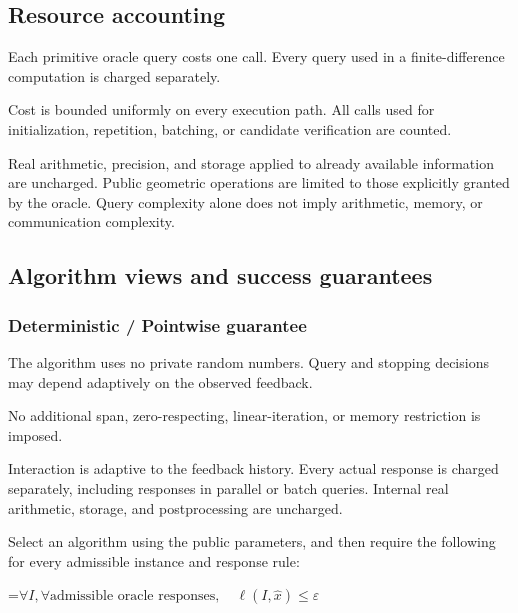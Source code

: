 \documentclass[10pt,a4paper]{article}
\newcommand{\AtlasMath}[1]{\par\begingroup\centering\setbox0=\hbox{$\displaystyle #1$}\ifdim\wd0>1.4\linewidth\typeout{ATLAS WIDE FORMULA: \the\wd0}\fi\ifdim\wd0>\linewidth\resizebox{\linewidth}{!}{\box0}\else\box0\fi\par\endgroup}
\begin{document}
\subsection{Resource accounting}


Each primitive oracle query costs one call. Every query used in a finite-difference computation is charged separately.



Cost is bounded uniformly on every execution path. All calls used for initialization, repetition, batching, or candidate verification are counted.



Real arithmetic, precision, and storage applied to already available information are uncharged. Public geometric operations are limited to those explicitly granted by the oracle. Query complexity alone does not imply arithmetic, memory, or communication complexity.



\subsection{Algorithm views and success guarantees}


\subsubsection{Deterministic / Pointwise guarantee}


The algorithm uses no private random numbers. Query and stopping decisions may depend adaptively on the observed feedback.



No additional span, zero-respecting, linear-iteration, or memory restriction is imposed.



Interaction is adaptive to the feedback history. Every actual response is charged separately, including responses in parallel or batch queries. Internal real arithmetic, storage, and postprocessing are uncharged.



Select an algorithm using the public parameters, and then require the following for every admissible instance and response rule:




\AtlasMath{\forall I,\forall\text{admissible oracle responses},\quad\ell(I,\widehat{x})\le\varepsilon}
\end{document}
